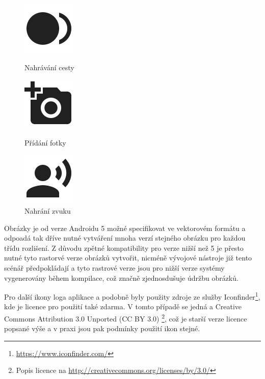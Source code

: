 \documentclass{article}
\begin{document}
\begin{figure}[H]
  \centering
  \includegraphics[scale=0.2]{img/record.png}
  \caption{Nahrávání cesty}\label{fig:record}
\endminipage\hfill
{}
  \centering
  \includegraphics[scale=0.2]{img/camera.png}
  \caption{Přídání fotky}\label{fig:camera}
\endminipage\hfill
{}%
  \centering
  \includegraphics[scale=0.2]{img/recordsound.png}
  \caption{Nahrání zvuku}\label{fig:recordsound}
\endminipage
\end{figure}

Obrázky je od verze Androidu 5 možné specifikovat ve vektorovém formátu a odpoadá tak dříve
nutné vytváření mnoha verzí stejného obrázku pro každou třídu rozlišení.
Z důvodu zpětné kompatibility pro verze nižší než 5 je přesto nutné tyto rastorvé verze obrázků
vytvořit, nicméně vývojové nástroje již tento scénář předpokládají a tyto rastrové verze jsou
pro nižší verze systémy vygenerovány během kompilace, což značně zjednosdušuje údržbu obrázků.



Pro další ikony loga aplikace a podobně byly použity zdroje ze služby
Iconfinder\footnote{\url{https://www.iconfinder.com/}}, kde je licence pro použití také zdarma. V tomto
případě se jedná a Creative Commons Attribution 3.0 Unported (CC BY 3.0)
\footnote{Popis licence na \url{http://creativecommons.org/licenses/by/3.0/}}, což je starší verze
licence popsané výše a v praxi jsou pak podmínky použití ikon stejné.





\end{document}
